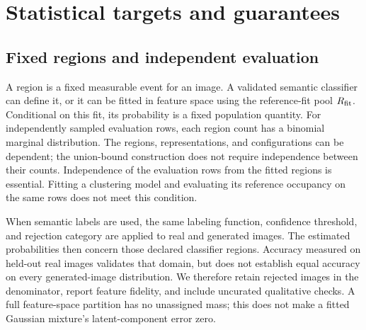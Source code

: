 \section{Statistical targets and guarantees}
\label{supp:statistics}

\subsection{Fixed regions and independent evaluation}
A region is a fixed measurable event for an image. A validated semantic
classifier can define it, or it can be fitted in feature space using the
reference-fit pool $R_{\rm fit}$.
Conditional on this fit, its probability is a fixed population quantity.
For independently sampled evaluation rows, each region count has a binomial
marginal distribution. The regions, representations, and configurations can be
dependent; the union-bound construction does not require independence between
their counts. Independence of the evaluation rows from the fitted regions is
essential. Fitting a clustering model and evaluating its reference occupancy on
the same rows does not meet this condition.

When semantic labels are used, the same labeling function, confidence threshold,
and rejection category are applied to real and generated images. The estimated
probabilities then concern those declared classifier regions. Accuracy measured
on held-out real images validates that domain, but does not establish equal
accuracy on every generated-image distribution. We therefore retain rejected
images in the denominator, report feature fidelity, and include uncurated
qualitative checks. A full feature-space partition has no unassigned mass;
this does not make a fitted Gaussian mixture's latent-component error zero.


